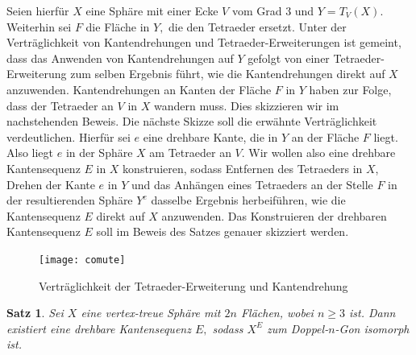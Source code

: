 \documentclass[12pt,titlepage,twoside,cleardoublepage]{article}
\theoremstyle{nummermitklammern}
\newtheorem{satz}[temp]{Satz}
\newtheorem{satz}[zahl]{Satz}
\numberwithin{equation}{section}
\begin{document}
Seien hierfür $X$ eine Sphäre mit einer Ecke $V$ vom Grad 3 und $Y=T_V(X)$. Weiterhin sei $F$ die Fläche in $Y,$ die den Tetraeder ersetzt. Unter der Verträglichkeit von Kantendrehungen und Tetraeder-Erweiterungen ist gemeint, dass das Anwenden von Kantendrehungen auf $Y$ gefolgt von einer Tetraeder-Erweiterung zum selben Ergebnis führt, wie die Kantendrehungen direkt auf $X$ anzuwenden. Kantendrehungen an Kanten der Fläche $F$ in $Y$ haben zur Folge, dass der Tetraeder an $V$ in $X$ wandern muss. Dies skizzieren wir im nachstehenden Beweis. Die nächste Skizze soll die erwähnte Verträglichkeit verdeutlichen. Hierfür sei $e$ eine drehbare Kante, die in $Y$ an der Fläche $F$ liegt. Also liegt $e$ in der Sphäre $X$ am Tetraeder an $V$. Wir wollen also eine drehbare Kantensequenz $E$ in $X$ konstruieren, sodass Entfernen des Tetraeders in $X$, Drehen der Kante $e$ in $Y$ und das Anhängen eines Tetraeders an der Stelle $F$ in der resultierenden Sphäre $Y^e$ dasselbe Ergebnis herbeiführen, wie die Kantensequenz $E$ direkt auf $X$ anzuwenden. Das Konstruieren der drehbaren Kantensequenz $E$ soll im Beweis des Satzes genauer skizziert werden.
\begin{center}
\begin{figure}[H]
\texttt{[image: comute]}
\caption{Verträglichkeit der Tetraeder-Erweiterung und Kantendrehung}
\end{figure}
\end{center}
\begin{satz}\label{3eck}
Sei $X$ eine vertex-treue Sphäre mit $2n$ Flächen, wobei $n\geq 3$ ist. Dann existiert eine drehbare Kantensequenz $E,$ sodass $X^E$ zum Doppel-$n$-Gon isomorph ist. 
\end{satz}
\end{document}
